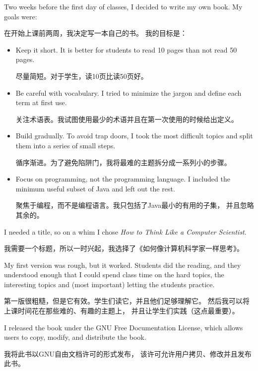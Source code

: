 \documentclass[10pt]{book}
\begin{document}
\begin{CJK}{UTF8}{gbsn}
Two weeks before the first day of classes, I decided to write my
own book.  
My goals were:

在开始上课前两周，我决定写一本自己的书。
我的目标是：

\begin{itemize}

\item Keep it short.  It is better for students to read 10 pages
than not read 50 pages.

尽量简短。对于学生，读10页比读50页好。

\item Be careful with vocabulary.  I tried to minimize the jargon
and define each term at first use.

关注术语表。我试图使用最少的术语并且在第一次使用的时候给出定义。

\item Build gradually. To avoid trap doors, I took the most difficult
topics and split them into a series of small steps. 

循序渐进。为了避免陷阱门，我将最难的主题拆分成一系列小的步骤。

\item Focus on programming, not the programming language.  I included
the minimum useful subset of Java and left out the rest.

聚焦于编程，而不是编程语言。我只包括了Java最小的有用的子集，
并且忽略其余的。

\end{itemize}

I needed a title, so on a whim I chose {\em How to Think Like
a Computer Scientist}.

我需要一个标题，所以一时兴起，我选择了《如何像计算机科学家一样思考》。

My first version was rough, but it worked.  Students did the reading,
and they understood enough that I could spend class time on the hard
topics, the interesting topics and (most important) letting the
students practice.

第一版很粗糙，但是它有效。学生们读它，并且他们足够理解它。
然后我可以将上课时间花在那些难的、有趣的主题上，
并且让学生们实践（这点最重要）。

I released the book under the GNU Free Documentation License,
which allows users to copy, modify, and distribute the book.

我将此书以GNU自由文档许可的形式发布，
该许可允许用户拷贝、修改并且发布此书。


\end{CJK}
\end{document}
